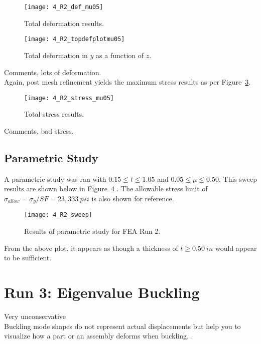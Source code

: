 \begin{figure}[H]
	\centering
	\texttt{[image: 4\_R2\_def\_mu05]}
	\caption{Total deformation results.}
	\label{fig:4_R2_def_mu05}
\end{figure}
\begin{figure}[H]
	\centering
	\texttt{[image: 4\_R2\_topdefplotmu05]}
	\caption{Total deformation in $y$ as a function of $z$.}
	\label{fig:4_R2_topdefplotmu05}
\end{figure}

Comments, lots of deformation.\\

Again, post mesh refinement yields the maximum stress results as per Figure~\ref{fig:4_R2_stress_mu05}.

\begin{figure}[H]
	\centering
	\texttt{[image: 4\_R2\_stress\_mu05]}
	\caption{Total stress results.}
	\label{fig:4_R2_stress_mu05}
\end{figure}

Comments, bad stress.


\subsection{Parametric Study}

A parametric study was ran with $0.15 \leq t \leq 1.05$ and $0.05 \leq \mu \leq 0.50$. This sweep results are shown below in Figure~\ref{fig:4_R2_sweep} \cite{EXCEL}. The allowable stress limit of $\sigma_{allow}=\sigma_{y}/SF = 23,333\ psi$ is also shown for reference.

\begin{figure}[H]
	\centering
	\texttt{[image: 4\_R2\_sweep]}
	\caption{Results of parametric study for FEA Run 2.}
	\label{fig:4_R2_sweep}
\end{figure}

From the above plot, it appears as though a thickness of $t \geq 0.50\ in$ would appear to be sufficient.


\section{Run 3: Eigenvalue Buckling}

Very unconservative \\

Buckling mode shapes do not represent actual displacements but help you to visualize how a part or an assembly deforms when buckling. \cite{ANSYS}. \\

